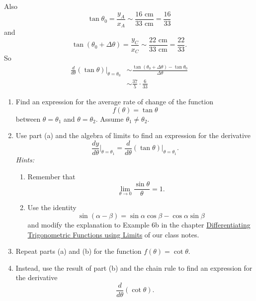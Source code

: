 \documentclass{ximera}
\begin{document}
\begin{question}
\begin{explanation}
Also
\[
  \tan\theta_0 = \frac{y_A}{x_A} \sim \frac{16 \text{ cm}}{33 \text{ cm}} = \frac{16}{33}
\]
and
\[
  \tan(\theta_0+\Delta \theta) = \frac{y_C}{x_C} \sim \frac{22 \text{ cm}}{33 \text{ cm}} = \frac{22}{33}.
\]
So
\begin{align*}
  \frac{d}{d\theta} \left( \tan\theta \right) \Big|_{\theta = \theta_0} &\sim \frac{\tan(\theta_0 + \Delta \theta) - \tan \theta_0}{\Delta \theta} \\
                                                                                               &\sim \frac{37}{5}\cdot \frac{6}{33}
\end{align*}

\end{explanation}

\end{question}


\begin{question} \label{Pfmf3901}
\begin{enumerate}
\item Find an expression for the average rate of change of the function
\[
      f(\theta) = \tan\theta
\]
between $\theta  =\theta_1$ and $\theta = \theta_2$. Assume $\theta_1 \neq \theta_2$.

\item Use part (a) and the algebra of limits to find an expression for the derivative
\[
     \frac{dy}{d\theta}\Big|_{\theta = \theta_1} =  \frac{d}{d\theta}\left( \tan\theta  \right)\Big|_{\theta = \theta_1} .
\]
\emph{Hints:} 
\begin{enumerate}
\item Remember that
\[
    \lim_{\theta\to 0} \frac{\sin\theta}{\theta} = 1.
\]

\item Use the identity
\[
      \sin(\alpha - \beta) = \sin \alpha\cos\beta - \cos\alpha \sin \beta 
\]
and modify the explanation to Example 6b in the chapter 
\href{https://ximera.osu.edu/calcone/Calculus1/TrigIntro/TrigIntro}{Differentiating Trigonometric Functions using Limits}
of our class notes.

\end{enumerate}


\item Repeat parts (a) and (b) for the function $f(\theta) = \cot\theta$.

\item Instead, use the result of part (b) and the chain rule to find an expression for the derivative
\[
 \frac{d}{d\theta}\left( \cot\theta \right).
\]

\end{enumerate}
\end{question}
\end{document}

